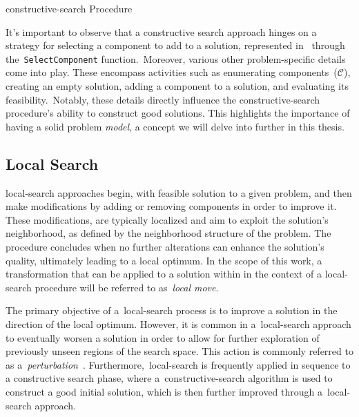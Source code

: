 \begin{algorithm}
  
  \caption{\acrlong{constructive-search} Procedure}
  \label{algorithm:cs}
\end{algorithm}

It's important to observe that a constructive search approach hinges on a
strategy for selecting a component to add to a solution, represented
in~ through the~\texttt{SelectComponent} function.~Moreover,
various other problem-specific details come into play. These encompass
activities such as enumerating components~($\mathcal{C}$), creating an empty solution, adding
a component to a solution, and evaluating its feasibility.~Notably, these details
directly influence the \acrshort{constructive-search} procedure's ability to
construct good solutions. This highlights the importance of having a solid
problem \textit{model}, a concept we will delve into further in this thesis.

\subsection{Local Search}
\label{subsec:local-search}

\acrfull{local-search} approaches begin, with feasible solution to a given
problem, and then make modifications by adding or removing components in order
to improve it. These modifications, are typically localized and aim to exploit
the solution's neighborhood, as defined by the neighborhood structure of the
problem. The procedure concludes when no further alterations can enhance the
solution's quality, ultimately leading to a local optimum. In the scope of this
work, a transformation that can be applied to a solution within in the context
of a \acrshort{local-search} procedure will be referred to as~\textit{local move}.

The primary objective of a~\acrshort{local-search} process is to improve a
solution in the direction of the local optimum. However, it is common in
a~\acrshort{local-search} approach to eventually worsen a solution in order
to allow for further exploration of previously unseen regions of the search
space. This action is commonly referred to as a~\textit{perturbation}~\cite{lourenco2010iterateda}.
Furthermore,~\acrshort{local-search} is frequently applied in sequence to a
constructive search phase, where a~\acrshort{constructive-search} algorithm is
used to construct a good initial solution, which is then further improved through
a~\acrshort{local-search} approach.


